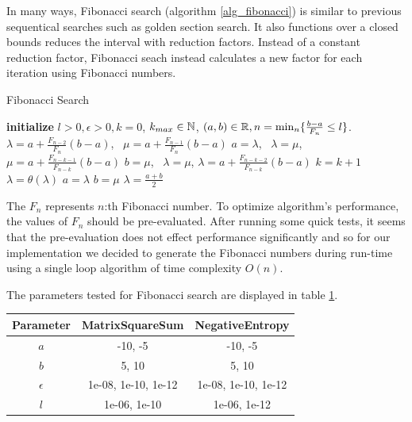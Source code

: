 \documentclass[a4paper,english,titlepage,12pt]{article}
\newcommand{\R}{\ensuremath\mathbb{R}}
\newcommand{\N}{\ensuremath\mathbb{N}}
\begin{document}
In many ways, Fibonacci search (algorithm \ref{alg_fibonacci}) is similar to previous sequentical searches such as golden section search. It also functions over a closed bounds reduces the interval with reduction factors. Instead of a constant reduction factor, Fibonacci seach instead calculates a new factor for each iteration using Fibonacci numbers. \cite{book:nonlinear_programming}

\begin{algorithm}[H]
\caption{Fibonacci Search}
\label{alg_fibonacci}
\begin{algorithmic}[1]
\STATE \textbf{initialize} $l > 0, \epsilon > 0, k = 0$, $k_{max} \in \N$, $(a, b) \in \R, n = \mathrm{min}_n \{ \frac{b - a}{F_n} \leq l \}$.
\STATE $\lambda = a + \frac{F_{n-2}}{F_n} (b - a)$, \  $\mu = a + \frac{F_{n-1}}{F_n} (b - a)$
    \IF{$\theta(\lambda) < \theta(\mu)$}
        \STATE $a = \lambda$, \ $\lambda = \mu$, $\mu = a + \frac{F_{n-k-1}}{F_{n-k}} (b - a)$
    \ELSE
        \STATE $b = \mu$, \ $\lambda = \mu$, $\lambda = a + \frac{F_{n-k-2}}{F_{n-k}} (b - a)$
    \ENDIF
    \STATE $k = k + 1$
\ENDWHILE
\STATE $\lambda = \theta(\lambda)$
\IF{$\theta(\lambda) > \theta(\mu + \epsilon)$}
    \STATE $a = \lambda$
\ELSE
    \STATE $b = \mu$
\ENDIF
\RETURN $\lambda = \frac{a + b}{2}$
\end{algorithmic}
\end{algorithm}

The $F_n$ represents $n$:th Fibonacci number. To optimize algorithm's performance, the values of $F_n$ should be pre-evaluated. After running some quick tests, it seems that the pre-evaluation does not effect performance significantly and so for our implementation we decided to generate the Fibonacci numbers during run-time using a single loop algorithm of time complexity $O(n)$.

The parameters tested for Fibonacci search are displayed in table \ref{tab:params_FibonacciSearch}.

\begin{table}[H]
\label{tab:params_FibonacciSearch}
\centering
{}
\begin{tabular}{|c|c|c|}
\hline
\rowcolor{gray!25}
Parameter & MatrixSquareSum & NegativeEntropy \\
\hline
$a$ & -10, -5 & -10, -5 \\
$b$ & 5, 10 & 5, 10 \\
$\epsilon$ & 1e-08, 1e-10, 1e-12 & 1e-08, 1e-10, 1e-12 \\
$l$ & 1e-06, 1e-10 & 1e-06, 1e-12 \\
\hline
\end{tabular}
\end{table}
\end{document}
